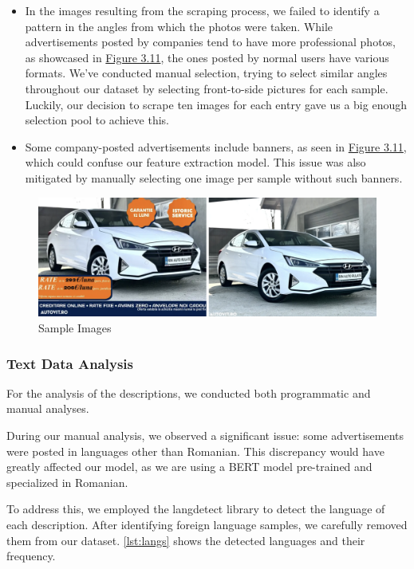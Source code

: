 \begin{itemize}
    \item In the images resulting from the scraping process, we failed to identify a pattern in the angles from which the photos were taken. While advertisements posted by companies tend to have more professional photos, as showcased in \hyperref[fig:sample-images]{Figure 3.11}, the ones posted by normal users have various formats. We've conducted manual selection, trying to select similar angles throughout our dataset by selecting front-to-side pictures for each sample. Luckily, our decision to scrape ten images for each entry gave us a big enough selection pool to achieve this.
    \item Some company-posted advertisements include banners, as seen in \hyperref[fig:sample-images]{Figure 3.11}, which could confuse our feature extraction model. This issue was also mitigated by manually selecting one image per sample without such banners.
\end{itemize}

\begin{figure}[ht]
    \centering
    \includegraphics[width=1\linewidth]{images/priceprediction/data/Screenshot 2024-05-28 at 21.33.30.png}
    \caption{Sample Images}
    \label{fig:sample-images}
\end{figure}

\subsubsection{Text Data Analysis}

For the analysis of the descriptions, we conducted both programmatic and manual analyses.

During our manual analysis, we observed a significant issue: some advertisements were posted in languages other than Romanian. This discrepancy would have greatly affected our model, as we are using a BERT model pre-trained and specialized in Romanian.

To address this, we employed the langdetect library \cite{langdetect} to detect the language of each description. After identifying foreign language samples, we carefully removed them from our dataset. \autoref{lst:langs} shows the detected languages and their frequency.

